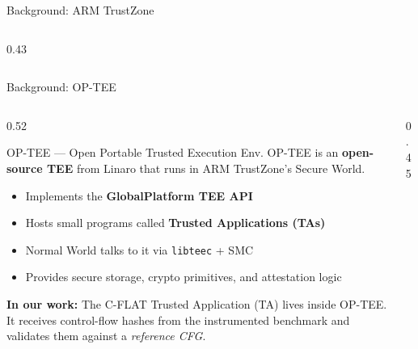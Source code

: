 \documentclass[aspectratio=169, 10pt]{beamer}
\begin{document}
\begin{frame}{Background: ARM TrustZone}
\begin{columns}[T]
\begin{column}{0.43\textwidth}
\begin{center}
            \end{center}
        \end{column}
    \end{columns}
\end{frame}

\begin{frame}{Background: OP-TEE}
    \begin{columns}[T]
        \begin{column}{0.52\textwidth}
            \begin{defbox}{OP-TEE — Open Portable Trusted Execution Env.}
                OP-TEE is an \textbf{open-source TEE} from Linaro that runs in
                ARM TrustZone's Secure World.
                \begin{itemize}
                    \item Implements the \textbf{GlobalPlatform TEE API}
                    \item Hosts small programs called
                          \textbf{Trusted Applications (TAs)}
                    \item Normal World talks to it via \texttt{libteec} + SMC
                    \item Provides secure storage, crypto primitives, and
                          attestation logic
                \end{itemize}
            \end{defbox}
            \vspace{4pt}
            \textbf{In our work:} The C-FLAT Trusted Application (TA) lives
            inside OP-TEE.  It receives control-flow hashes from the instrumented
            benchmark and validates them against a \emph{reference CFG}.
        \end{column}
        \begin{column}{0.45\textwidth}
            \begin{center}
\end{center}
\end{column}
\end{columns}
\end{frame}
\end{document}
